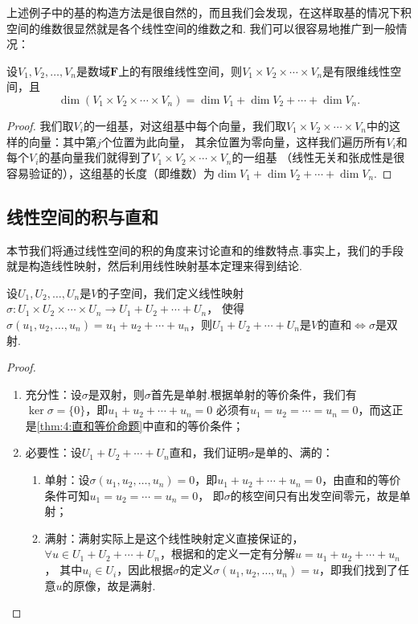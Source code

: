 上述例子中的基的构造方法是很自然的，而且我们会发现，在这样取基的情况下积空间的维数很显然就是各个线性空间的维数之和.
我们可以很容易地推广到一般情况：
\begin{theorem}\label{thm:8:积空间维数}
    设$V_1,V_2,\ldots,V_n$是数域$\mathbf{F}$上的有限维线性空间，则$V_1 \times V_2 \times \cdots \times V_n$是有限维线性空间，且
    \[\dim(V_1 \times V_2 \times \cdots \times V_n)=\dim V_1+\dim V_2+\cdots+\dim V_n.\]
\end{theorem}
\begin{proof}
    我们取$V_i$的一组基，对这组基中每个向量，我们取$V_1 \times V_2 \times \cdots \times V_n$中的这样的向量：其中第$j$个位置为此向量，
    其余位置为零向量，这样我们遍历所有$V_i$和每个$V_i$的基向量我们就得到了$V_1 \times V_2 \times \cdots \times V_n$的一组基
    （线性无关和张成性是很容易验证的），这组基的长度（即维数）为$\dim V_1+\dim V_2+\cdots+\dim V_n$.
\end{proof}

\subsection{线性空间的积与直和}
本节我们将通过线性空间的积的角度来讨论直和的维数特点.事实上，我们的手段就是构造线性映射，然后利用线性映射基本定理来得到结论.
\begin{theorem}\label{thm:8:积与直和}
    设$U_1,U_2,\ldots,U_n$是$V$的子空间，我们定义线性映射$\sigma:U_1 \times U_2 \times \cdots \times U_n \to U_1+U_2+\cdots+U_n$，
    使得$\sigma(u_1,u_2,\ldots,u_n)=u_1+u_2+\cdots+u_n$，则$U_1+U_2+\cdots+U_n$是$V$的直和$\iff \sigma$是双射.
\end{theorem}
\begin{proof}
    \begin{enumerate}
        \item 充分性：设$\sigma$是双射，则$\sigma$首先是单射.根据单射的等价条件，我们有$\ker \sigma=\{0\}$，即$u_1+u_2+\cdots+u_n=0$
        必须有$u_1=u_2=\cdots=u_n=0$，而这正是\autoref{thm:4:直和等价命题}中直和的等价条件；

        \item 必要性：设$U_1+U_2+\cdots+U_n$直和，我们证明$\sigma$是单的、满的：
        \begin{enumerate}
            \item 单射：设$\sigma(u_1,u_2,\ldots,u_n)=0$，即$u_1+u_2+\cdots+u_n=0$，由直和的等价条件可知$u_1=u_2=\cdots=u_n=0$，
            即$\sigma$的核空间只有出发空间零元，故是单射；
            \item 满射：满射实际上是这个线性映射定义直接保证的，$\forall u \in U_1+U_2+\cdots+U_n$，根据和的定义一定有分解$u=u_1+u_2+\cdots+u_n$，
            其中$u_i \in U_i$，因此根据$\sigma$的定义$\sigma(u_1,u_2,\ldots,u_n)=u$，即我们找到了任意$u$的原像，故是满射.
        \end{enumerate}
    \end{enumerate}
\end{proof}

